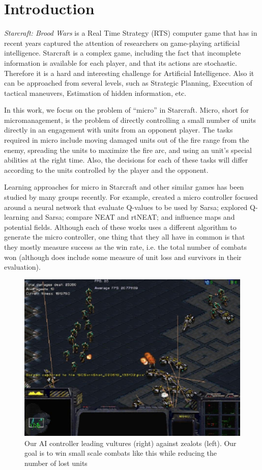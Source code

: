 \section{Introduction}\label{section:introduction}

\emph{Starcraft: Brood Wars} is a Real Time Strategy (RTS) computer
game that has in recent years captured the attention of researchers on
game-playing artificial intelligence. Starcraft is a complex game,
including the fact that incomplete information is available for each
player, and that its actions are stochastic. Therefore it is a hard
and interesting challenge for Artificial Intelligence. Also it can be
approached from several levels, such as Strategic Planning, Execution
of tactical maneuvers, Estimation of hidden information, etc.

In this work, we focus on the problem of ``micro'' in
Starcraft. Micro, short for micromanagement, is the problem of
directly controlling a small number of units directly in an engagement
with units from an opponent player. The tasks required in micro
include moving damaged units out of the fire range from the enemy,
spreading the units to maximize the fire arc, and using an unit's
special abilities at the right time. Also, the decisions for each of
these tasks will differ according to the units controlled by the
player and the opponent.

Learning approaches for micro in Starcraft and other similar games has
been studied by many groups recently. For example, \citet{Shantia11ConnectionistSC}
created a micro controller focused
around a neural network that evaluate Q-values to be used by Sarsa;
\citet{Wender12ReinforcementMicroSC} explored Q-learning and Sarsa;
\citet{Zhen13NeuroEvoSC} compare NEAT and rtNEAT; and \citet{Liu14EffectiveMicro}
influence maps and potential fields.  Although each of these works uses a different
algorithm to generate the micro controller, one thing that they all
have in common is that they mostly measure success as the win rate,
i.e. the total number of combats won (although \citet{Liu14EffectiveMicro} does include
some measure of unit loss and survivors in their evaluation).

\begin{figure}
  \includegraphics[width=.45\textwidth]{figures/vultures_vs_zealots_combat}
  \caption{Our AI controller leading vultures (right) against zealots
    (left). Our goal is to win small scale combats like this while
    reducing the number of lost units}
    \label{fig:combat-example}
\end{figure}

